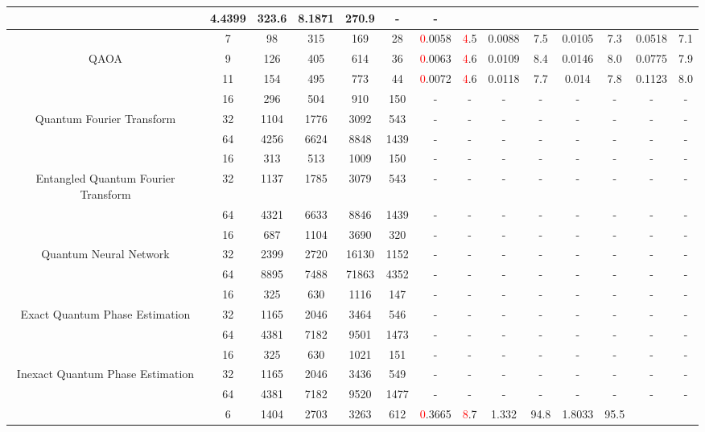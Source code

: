 \begin{table}[htb]
{\begin{tabular}{|c|c|c|c|c|c|c|c|c|c|c|c|c|c|}
 & 4.4399 & 323.6
 & 8.1871 & 270.9
 & - & -
 \\
\hline
 & 
7 & 98 & 315 & 169 & 28
 & \textcolor{red}0.0058 & \textcolor{red}4.5
 & 0.0088 & 7.5
 & 0.0105 & 7.3
 & 0.0518 & 7.1
 \\
QAOA & 
9 & 126 & 405 & 614 & 36
 & \textcolor{red}0.0063 & \textcolor{red}4.6
 & 0.0109 & 8.4
 & 0.0146 & 8.0
 & 0.0775 & 7.9
 \\
 & 
11 & 154 & 495 & 773 & 44
 & \textcolor{red}0.0072 & \textcolor{red}4.6
 & 0.0118 & 7.7
 & 0.014 & 7.8
 & 0.1123 & 8.0
 \\
\hline
 & 
16 & 296 & 504 & 910 & 150
 & - & -
 & - & -
 & - & -
 & - & -
 \\
Quantum Fourier Transform & 
32 & 1104 & 1776 & 3092 & 543
 & - & -
 & - & -
 & - & -
 & - & -
 \\
 & 
64 & 4256 & 6624 & 8848 & 1439
 & - & -
 & - & -
 & - & -
 & - & -
 \\
\hline
 & 
16 & 313 & 513 & 1009 & 150
 & - & -
 & - & -
 & - & -
 & - & -
 \\
Entangled Quantum Fourier Transform & 
32 & 1137 & 1785 & 3079 & 543
 & - & -
 & - & -
 & - & -
 & - & -
 \\
 & 
64 & 4321 & 6633 & 8846 & 1439
 & - & -
 & - & -
 & - & -
 & - & -
 \\
\hline
 & 
16 & 687 & 1104 & 3690 & 320
 & - & -
 & - & -
 & - & -
 & - & -
 \\
Quantum Neural Network & 
32 & 2399 & 2720 & 16130 & 1152
 & - & -
 & - & -
 & - & -
 & - & -
 \\
 & 
64 & 8895 & 7488 & 71863 & 4352
 & - & -
 & - & -
 & - & -
 & - & -
 \\
\hline
 & 
16 & 325 & 630 & 1116 & 147
 & - & -
 & - & -
 & - & -
 & - & -
 \\
Exact Quantum Phase Estimation & 
32 & 1165 & 2046 & 3464 & 546
 & - & -
 & - & -
 & - & -
 & - & -
 \\
 & 
64 & 4381 & 7182 & 9501 & 1473
 & - & -
 & - & -
 & - & -
 & - & -
 \\
\hline
 & 
16 & 325 & 630 & 1021 & 151
 & - & -
 & - & -
 & - & -
 & - & -
 \\
Inexact Quantum Phase Estimation & 
32 & 1165 & 2046 & 3436 & 549
 & - & -
 & - & -
 & - & -
 & - & -
 \\
 & 
64 & 4381 & 7182 & 9520 & 1477
 & - & -
 & - & -
 & - & -
 & - & -
 \\
\hline
 & 
6 & 1404 & 2703 & 3263 & 612
 & \textcolor{red}0.3665 & \textcolor{red}8.7
 & 1.332 & 94.8
 & 1.8033 & 95.5

\end{tabular}}
\end{table}
